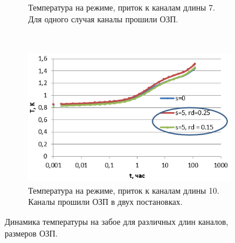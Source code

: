 \begin{figure}[H]
\begin{subfigure}[b]{0.5\textwidth}
	\caption{Температура на режиме, приток к каналам длины 7. Для одного случая каналы прошили ОЗП.}
	\label{pic:tunnels7}
	\end{subfigure}
~
	\begin{subfigure}[b]{0.5\textwidth}
		\centering
		\includegraphics[width=1\textwidth]{pic/tunnels10.png}
		\caption{Температура на режиме, приток к каналам длины 10. Каналы прошили ОЗП в двух постановках.}
		\label{pic:tunnels10}
	\end{subfigure}

	\caption{Динамика температуры на забое для различных длин каналов, размеров ОЗП.}
	\label{pic:tunnelss}
\end{figure}

